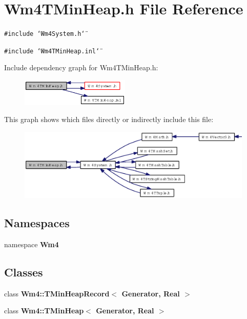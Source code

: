 \section{Wm4TMin\-Heap.h File Reference}
\label{Wm4TMinHeap_8h}
{\tt \#include \char`\"{}Wm4System.h\char`\"{}}\par
{\tt \#include \char`\"{}Wm4TMin\-Heap.inl\char`\"{}}\par


Include dependency graph for Wm4TMin\-Heap.h:\begin{figure}[H]
\begin{center}
\leavevmode
\includegraphics[width=147pt]{Wm4TMinHeap_8h__incl}
\end{center}
\end{figure}


This graph shows which files directly or indirectly include this file:\begin{figure}[H]
\begin{center}
\leavevmode
\includegraphics[width=354pt]{Wm4TMinHeap_8h__dep__incl}
\end{center}
\end{figure}
\subsection*{Namespaces}
\begin{CompactItemize}
\item 
namespace {\bf Wm4}
\end{CompactItemize}
\subsection*{Classes}
\begin{CompactItemize}
\item 
class {\bf Wm4::TMin\-Heap\-Record$<$ Generator, Real $>$}
\item 
class {\bf Wm4::TMin\-Heap$<$ Generator, Real $>$}
\end{CompactItemize}
